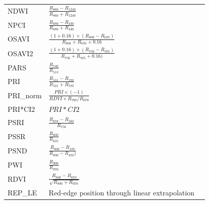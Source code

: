 \documentclass[remotesensing,article,submit,moreauthors,pdftex]{Definitions/mdpi}
\begin{document}
{\begin{supertabular}{lll}
		NDWI            & $\frac{R_{860}-R_{1240}}{R_{860}+R_{1240}}$                                                          & \cite{gao1996}                \\
		NPCI            & $\frac{R_{680}-R_{430}}{R_{680}+R_{430}}$                                                            & \cite{penuelas1994}           \\
		OSAVI           & $\frac{(1+0.16) \times (R_{800}-R_{670})}{R_{800}+R_{670}+0.16 }$                                    & \cite{rondeaux1996}           \\
		OSAVI2          & $\frac{(1+0.16)\times (R_{750}-R_{705})}{R_{750}+R_{705}+0.16) }$                                    & \cite{wu2008a}                \\
		PARS            & $\frac{R_{746}}{R_{513}}$                                                                            & \cite{chappelle1992}          \\
		PRI             & $\frac{R_{531}-R_{570}}{R_{531}+R_{570}}$                                                            & \cite{gamon1992}              \\
		PRI\_norm       & $\frac{PRI \times (-1) }{RDVI\times R_{700}/R_{670}}$                                                & \cite{zarco-tejada2013a}      \\
		PRI*CI2         & $PRI*CI2$                                                                                            & \cite{garrity2011}            \\
		PSRI            & $\frac{R_{678}-R_{500}}{R_{750}}$                                                                    & \cite{merzlyak1999}           \\
		PSSR            & $\frac{R_{800}}{R_{635}}$                                                                            & \cite{blackburn1998}          \\
		PSND            & $\frac{R_{800}-R_{470}}{R_{800}-R_{470})}$                                                           & \cite{blackburn1998}          \\
		PWI             & $\frac{R_{900}}{R_{970}}$                                                                            & \cite{penuelas1997}           \\
		RDVI            & $\frac{R_{800}-R_{670}}{ \sqrt{R_{800}+R_{670}}}$                                                    & \cite{roujean1995}            \\
		\midrule
		REP\_LE         & \parbox{3.8cm}{Red-edge position through linear extrapolation}                                       & \cite{cho2006}                \\

\end{supertabular}}
\end{document}
